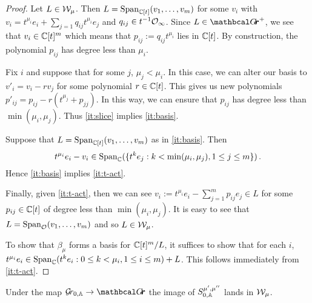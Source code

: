 \documentclass{article} %
\begin{document}
\begin{proof}
    Let $ L \in \cW_\mu$.  Then $ L = \Sp_{\CC[t]}(v_1, \dots, v_m) $ for some $ v_i $ with $ v_i = t^{\mu_i} e_i + \sum_{j=1} q_{ij}t^{\mu_i} e_j $ and $ q_{ij} \in t^{-1} \Oinf$.  Since $ L \in \Grth^+ $, we see that $ v_i \in \CC[t]^m$ which means that $ p_{ij} := q_{ij}t^{\mu_i} $ lies in $ \CC[t]$.  By construction, the polynomial $ p_{ij}$ has degree less than $ \mu_i$.
    
    Fix $ i$ and suppose that for some $ j$, $ \mu_j < \mu_i$.  In this case, we can alter our basis to $ v'_i = v_i - r v_j$ for some polynomial $r \in \CC[t]$.  This gives us new polynomials $ p'_{ij} = p_{ij} - r (t^{\mu_j} + p_{jj}) $.  In this way, we can ensure that $ p_{ij} $ has degree less than $ \min(\mu_i, \mu_j)$.  
    Thus \cref{it:slice} implies \cref{it:basis}.
    
    Suppose that $ L = \Sp_{\CC[t]}(v_1, \dots, v_m)$ as in \cref{it:basis}.  Then
    $$t^{\mu_i} e_i - v_i \in \Sp_\CC(\{t^k e_j :  k < \min(\mu_i, \mu_j), 1 \le j \le m \})  \,. $$
    Hence \cref{it:basis} implies \cref{it:t-act}.  

    Finally, given \cref{it:t-act}, then we can see $ v_i := t^{\mu_i} e_i - \sum_{j=1}^m p_{ij} e_j \in L $ for some $ p_{ij} \in \CC[t]$ of degree less than $ \min(\mu_i,\mu_j) $.  It is easy to see that $ L = \Sp_\cO(v_1, \dots, v_m) $ and so $ L \in \cW_\mu$.  
    
    To show that $ \beta_\mu$ forms a basis for $ \CC[t]^m/L$, it suffices to show that for each $ i$, $ t^{\mu_i} e_i  \in \Sp_\CC(  t^k e_i : 0 \le k < \mu_i, 1 \le i \le m) + L$. 
    This follows immediately from \cref{it:t-act}.
\end{proof}
% 
\begin{lemma}
\label{le:inftyfusiskl} %
    Under the map $ \Grbd \rightarrow \Grth$ the image of $ S^{\mu', \mu''}_{0,\AA}$ lands in $ \cW_\mu$.
\end{lemma}
\end{document}

